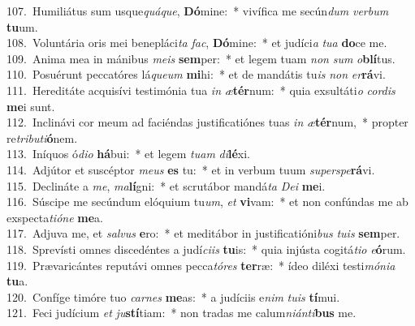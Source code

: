 {107.~}Humiliátus sum usque\textit{quá}\textit{que}, \textbf{Dó}mine:~* vivífica me secún\textit{dum} \textit{ver}\textit{bum} \textbf{tu}um.\\
{108.~}Voluntária oris mei benepláci\textit{ta} \textit{fac}, \textbf{Dó}mine:~* et judíci\textit{a} \textit{tu}\textit{a} \textbf{do}ce me.\\
{109.~}Anima mea in mánibus \textit{me}\textit{is} \textbf{sem}per:~* et legem tuam \textit{non} \textit{sum} \textit{o}\textbf{blí}tus.\\
{110.~}Posuérunt peccatóres lá\textit{que}\textit{um} \textbf{mi}hi:~* et de mandátis tu\textit{is} \textit{non} \textit{er}\textbf{rá}vi.\\
{111.~}Hereditáte acquisívi testimónia tua \textit{in} \textit{æ}\textbf{tér}num:~* quia exsultáti\textit{o} \textit{cor}\textit{dis} \textbf{me}i sunt.\\
{112.~}Inclinávi cor meum ad faciéndas justificatiónes tuas \textit{in} \textit{æ}\textbf{tér}num,~* propter re\textit{tri}\textit{bu}\textit{ti}\textbf{ó}nem.\\
{113.~}Iníquos ó\textit{di}\textit{o} \textbf{há}bui:~* et legem \textit{tu}\textit{am} \textit{di}\textbf{lé}xi.\\
{114.~}Adjútor et suscéptor \textit{me}\textit{us} \textbf{es} tu:~* et in verbum tuum \textit{su}\textit{per}\textit{spe}\textbf{rá}vi.\\
{115.~}Declináte a \textit{me}, \textit{ma}\textbf{lí}gni:~* et scrutábor mandá\textit{ta} \textit{De}\textit{i} \textbf{me}i.\\
{116.~}Súscipe me secúndum elóquium tu\textit{um}, \textit{et} \textbf{vi}vam:~* et non confúndas me ab exspecta\textit{ti}\textit{ó}\textit{ne} \textbf{me}a.\\
{117.~}Adjuva me, et \textit{sal}\textit{vus} \textbf{e}ro:~* et meditábor in justificatióni\textit{bus} \textit{tu}\textit{is} \textbf{sem}per.\\
{118.~}Sprevísti omnes discedéntes a judí\textit{ci}\textit{is} \textbf{tu}is:~* quia injústa cogitá\textit{ti}\textit{o} \textit{e}\textbf{ó}rum.\\
{119.~}Prævaricántes reputávi omnes pecca\textit{tó}\textit{res} \textbf{ter}ræ:~* ídeo diléxi testi\textit{mó}\textit{ni}\textit{a} \textbf{tu}a.\\
{120.~}Confíge timóre tuo \textit{car}\textit{nes} \textbf{me}as:~* a judíciis e\textit{nim} \textit{tu}\textit{is} \textbf{tí}mui.\\
{121.~}Feci judícium \textit{et} \textit{ju}\textbf{stí}tiam:~* non tradas me calum\textit{ni}\textit{án}\textit{ti}\textbf{bus} me.\\
